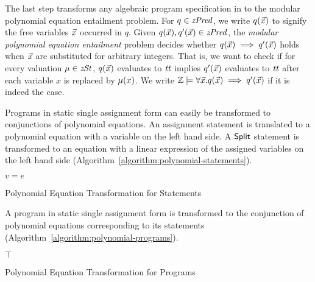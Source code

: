 
The last step transforms any algebraic program specification in \zdsl to the
modular polynomial equation entailment problem. For
$q \in \mathit{zPred}$, we write $q(\vec{x})$ to signify the free variables $\vec{x}$
occurred in $q$. Given $q(\vec{x}), q'(\vec{x}) \in \mathit{zPred}$, the \emph{modular
  polynomial equation entailment} problem decides whether
$q(\vec{x}) \implies q'(\vec{x})$ holds when $\vec{x}$ are substituted for
arbitrary integers. That is, we want to check if for every valuation $\mu \in \mathit{zSt}$, $q(\vec{x})$ evaluates to $\mathit{tt}$ implies $q'(\vec{x})$ evaluates to $\mathit{tt}$ after each variable $x$ is replaced by $\mu(x)$.
We write $\mathbb{Z} \models \forall \vec{x}. q(\vec{x}) \implies q'(\vec{x})$ if it is indeed the case.

Programs in static single assignment form can easily be transformed to
conjunctions of polynomial equations. An assignment statement is
translated to a polynomial equation with a variable on the left hand side.
A $\mbox{\textsf{Split}}$ statement is transformed to an
equation with a linear expression of the assigned variables on the
left hand side (Algorithm~\ref{algorithm:polynomial-statements}).
\begin{algorithm}
  \begin{algorithmic}[1]
        \Return $v = e$
      \EndCase
      \EndCase
    \EndMatch
    \EndFunction
  \end{algorithmic}
  \caption{Polynomial Equation Transformation for Statements}
  \label{algorithm:polynomial-statements}
\end{algorithm}

A program in static single assignment form is transformed to the
conjunction of polynomial equations corresponding to its statements
(Algorithm~\ref{algorithm:polynomial-programs}).

\begin{algorithm}
  \begin{algorithmic}[1]
      \Case{$\epsilon$} \Return $\top$ \EndCase
      \EndCase
    \EndMatch
    \EndFunction
  \end{algorithmic}
  \caption{Polynomial Equation Transformation for Programs}
  \label{algorithm:polynomial-programs}
\end{algorithm}

